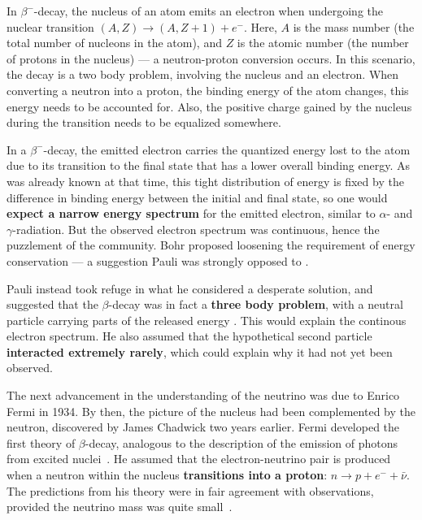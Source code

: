 In $\beta^-$-decay, the nucleus of an atom emits an electron when undergoing the nuclear transition $(A,Z)\rightarrow(A,Z+1) + e^-$. Here, $A$ is the mass number (the total number of nucleons in the atom), and $Z$ is the atomic number (the number of protons in the nucleus) --- a neutron-proton conversion occurs. In this scenario, the decay is a two body problem, involving the nucleus and an electron. When converting a neutron into a proton, the binding energy of the atom changes, this energy needs to be accounted for. Also, the positive charge gained by the nucleus during the transition needs to be equalized somewhere.

In a $\beta^-$-decay, the emitted electron carries the quantized energy lost to the atom due to its transition to the final state that has a lower overall binding energy. As was already known at that time, this tight distribution of energy is fixed by the difference in binding energy between the initial and final state, so one would \textbf{expect a narrow energy spectrum} for the emitted electron, similar to $\alpha$- and $\gamma$-radiation. But the observed electron spectrum was continuous, hence the puzzlement of the community. Bohr proposed loosening the requirement of energy conservation --- a suggestion Pauli was strongly opposed to .

Pauli instead took refuge in what he considered a desperate solution, and suggested that the $\beta$-decay was in fact a \textbf{three body problem}, with a neutral particle carrying parts of the released energy . This would explain the continous electron spectrum. He also assumed that the hypothetical second particle \textbf{interacted extremely rarely}, which could explain why it had not yet been observed.

The next advancement in the understanding of the neutrino was due to Enrico Fermi in 1934. By then, the picture of the nucleus had been complemented by the neutron, discovered by James Chadwick two years earlier. Fermi developed the first theory of $\beta$-decay, analogous to the description of the emission of photons from excited nuclei~\cite{Fermi1934}. He assumed that the electron-neutrino pair is produced when a neutron within the nucleus \textbf{transitions into a proton}: $n \rightarrow p + e^- + \bar{\nu}$. The predictions from his theory were in fair agreement with observations, provided the neutrino mass was quite small~\cite{Fermi1934}.

